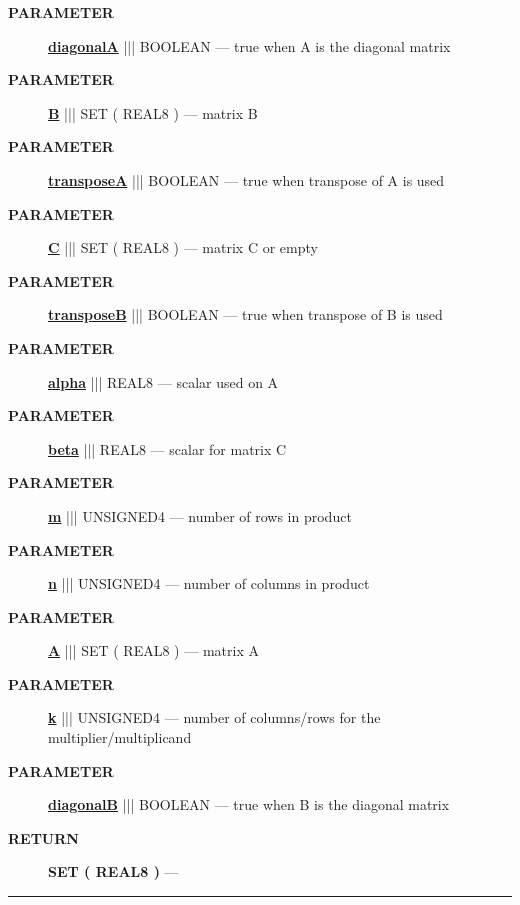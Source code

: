 \par
\begin{description}
\item [\colorbox{tagtype}{\color{white} \textbf{\textsf{PARAMETER}}}] \textbf{\underline{diagonalA}} ||| BOOLEAN --- true when A is the diagonal matrix
\item [\colorbox{tagtype}{\color{white} \textbf{\textsf{PARAMETER}}}] \textbf{\underline{B}} ||| SET ( REAL8 ) --- matrix B
\item [\colorbox{tagtype}{\color{white} \textbf{\textsf{PARAMETER}}}] \textbf{\underline{transposeA}} ||| BOOLEAN --- true when transpose of A is used
\item [\colorbox{tagtype}{\color{white} \textbf{\textsf{PARAMETER}}}] \textbf{\underline{C}} ||| SET ( REAL8 ) --- matrix C or empty
\item [\colorbox{tagtype}{\color{white} \textbf{\textsf{PARAMETER}}}] \textbf{\underline{transposeB}} ||| BOOLEAN --- true when transpose of B is used
\item [\colorbox{tagtype}{\color{white} \textbf{\textsf{PARAMETER}}}] \textbf{\underline{alpha}} ||| REAL8 --- scalar used on A
\item [\colorbox{tagtype}{\color{white} \textbf{\textsf{PARAMETER}}}] \textbf{\underline{beta}} ||| REAL8 --- scalar for matrix C
\item [\colorbox{tagtype}{\color{white} \textbf{\textsf{PARAMETER}}}] \textbf{\underline{m}} ||| UNSIGNED4 --- number of rows in product
\item [\colorbox{tagtype}{\color{white} \textbf{\textsf{PARAMETER}}}] \textbf{\underline{n}} ||| UNSIGNED4 --- number of columns in product
\item [\colorbox{tagtype}{\color{white} \textbf{\textsf{PARAMETER}}}] \textbf{\underline{A}} ||| SET ( REAL8 ) --- matrix A
\item [\colorbox{tagtype}{\color{white} \textbf{\textsf{PARAMETER}}}] \textbf{\underline{k}} ||| UNSIGNED4 --- number of columns/rows for the multiplier/multiplicand
\item [\colorbox{tagtype}{\color{white} \textbf{\textsf{PARAMETER}}}] \textbf{\underline{diagonalB}} ||| BOOLEAN --- true when B is the diagonal matrix
\end{description}







\par
\begin{description}
\item [\colorbox{tagtype}{\color{white} \textbf{\textsf{RETURN}}}] \textbf{SET ( REAL8 )} --- 
\end{description}




\rule{\linewidth}{0.5pt}
